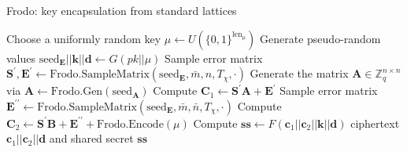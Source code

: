 \documentclass{beamer}            %
\begin{document}

\begin{frame}{Frodo: key encapsulation from standard lattices}

\begin{center}

\begin{algorithm}[H]
\centering
\footnotesize
\caption{The \textsf{FrodoKEM} encapsulation (shortened)} \label{alg:decaps}
  \begin{algorithmic}
	\State Choose a uniformly random key $\mu \leftarrow U(\{0,1\}^{\text{len}_\mu})$
	\State Generate pseudo-random values $\text{seed}_\mathbf{E} || \mathbf{k} || \mathbf{d} \leftarrow G(pk || \mu)$
	\State Sample error matrix $\mathbf{S}^\prime,\mathbf{E}^\prime \leftarrow \text{Frodo.SampleMatrix}(\text{seed}_\mathbf{E},\bar{m},n,T_\chi,\cdot)$
	 \State Generate the matrix $\mathbf{A} \in \mathbb{Z}^{n \times n}_{q}$ via $\mathbf{A} \leftarrow \text{Frodo.Gen}(\text{seed}_\mathbf{A})$
	 \State Compute $\mathbf{C}_1 \leftarrow \mathbf{S}^\prime \mathbf{A} + \mathbf{E}^\prime$
	 \State Sample error matrix $\mathbf{E}^{\prime\prime} \leftarrow \text{Frodo.SampleMatrix}(\text{seed}_\mathbf{E},\bar{m},\bar{n},T_\chi,\cdot	)$
	 \State Compute $\mathbf{C}_2 \leftarrow \mathbf{S}^\prime \mathbf{B} + \mathbf{E}^{\prime\prime}+ \text{Frodo.Encode}(\mu)$
	 \State Compute $\mathbf{ss} \leftarrow F(\mathbf{c}_1 || \mathbf{c}_2 || \mathbf{k} || \mathbf{d})$
	\State \Return ciphertext $\mathbf{c}_1 || \mathbf{c}_2 || \mathbf{d}$ and shared secret $\mathbf{ss}$
    \EndProcedure
    \end{algorithmic}
\end{algorithm}
\end{center}

\end{frame}


\end{document}
